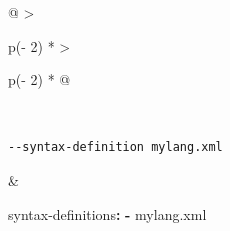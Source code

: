 \documentclass[
  b5paper
]{book}
\newenvironment{Shaded}{}{}
\newcommand{\AttributeTok}[1]{\textcolor[rgb]{0.49,0.56,0.16}{#1}}
\newcommand{\FunctionTok}[1]{\textcolor[rgb]{0.02,0.16,0.49}{#1}}
\newcommand{\KeywordTok}[1]{\textcolor[rgb]{0.00,0.44,0.13}{\textbf{#1}}}
\begin{document}
\begin{longtable}[]{@{}
  >{\raggedright\arraybackslash}p{(\columnwidth - 2\tabcolsep) * }
  >{\raggedright\arraybackslash}p{(\columnwidth - 2\tabcolsep) * }@{}}
\begin{minipage}[t]{\linewidth}
\begin{Shaded}
\begin{Highlighting}[]
\end{Highlighting}
\end{Shaded}
\end{minipage} \\
\begin{minipage}[t]{\linewidth}\raggedright
\begin{verbatim}
--syntax-definition mylang.xml
\end{verbatim}
\end{minipage} & \begin{minipage}[t]{\linewidth}\raggedright
\begin{Shaded}
\begin{Highlighting}[]
\FunctionTok{syntax{-}definitions}\KeywordTok{:}
\AttributeTok{  }\KeywordTok{{-}}\AttributeTok{ mylang.xml}
\end{Highlighting}
\end{Shaded}


\end{minipage}
\end{longtable}
\end{document}
